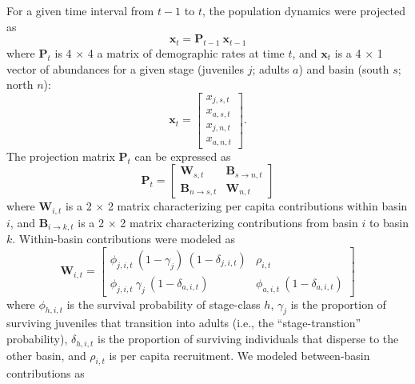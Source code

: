 \documentclass[11pt]{article}
\begin{document}
For a given time interval from $t-1$ to $t$, 
the population dynamics were projected as
%
\begin{equation} \label{eq:XPX}
    \mathbf{x}_t = \mathbf{P}_{t-1}~\mathbf{x}_{t-1}
\end{equation}
%
where $\mathbf{P}_{t}$ is 4 $\times$ 4 a matrix of demographic rates at time $t$, 
and $\mathbf{x}_{t}$ is a 4 $\times$ 1 vector of abundances 
for a given stage (juveniles $j$; adults $a$) 
and basin (south $s$; north $n$):
%
\begin{equation} \label{eq:X}
\mathbf{x}_{t} = 
\left[
\begin{array}{cccc}
    {x_{j,s,t}} \\
    {x_{a,s,t}} \\
    {x_{j,n,t}} \\
    {x_{a,n,t}}
    \end{array}
\right]
\text{.}
\end{equation}
%
The projection matrix $\mathbf{P}_{t}$ can be expressed as
%
\begin{equation} \label{eq:P}
\mathbf{P}_{t} = 
\left[
\begin{array}{c|ccc}
    \mathbf{W}_{s,t}  & \mathbf{B}_{s\rightarrow n,t} \\
    \hline
    \mathbf{B}_{n\rightarrow s,t} & \mathbf{W}_{n,t}
    \end{array}
\right]
\end{equation}
%
where $\mathbf{W}_{i,t}$ is a 2 $\times$ 2 matrix characterizing 
per capita contributions within basin $i$,
and $\mathbf{B}_{i\rightarrow k,t}$ is a 2 $\times$ 2 matrix characterizing 
contributions from basin $i$ to basin $k$.
Within-basin contributions were modeled as 
\begin{equation} \label{eq:W}
\mathbf{W}_{i,t} = 
\left[
\begin{array}{cccc}
    \phi_{j,i,t}~(1-\gamma_{j})~(1-\delta_{j,i,t}) & 
    \rho_{i,t} \\
    \phi_{j,i,t}~\gamma_{j}~(1-\delta_{a,i,t}) & 
    \phi_{a,i,t}~(1-\delta_{a,i,t})
    \end{array}
\right]
\end{equation}
%
where $\phi_{h,i,t}$ is the survival probability of stage-class $h$, 
$\gamma_{j}$ is the proportion of surviving juveniles that transition into adults
(i.e., the ``stage-transtion'' probability),
$\delta_{h,i,t}$ is the proportion of surviving individuals that disperse to the other basin,
and $\rho_{i,t}$ is per capita recruitment.
We modeled between-basin contributions as
\end{document}
